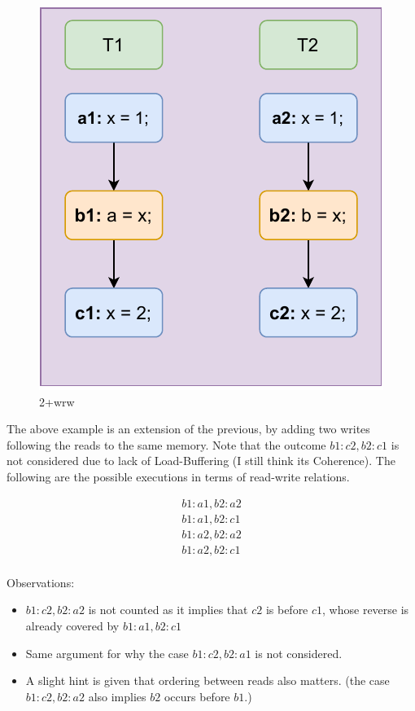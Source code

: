         \begin{figure}[H]
            \centering 
            \includegraphics[scale=0.7]{Example2(2+wrw).pdf}
            \caption{2+wrw}
        \end{figure}
        
        The above example is an extension of the previous, by adding two writes following the reads to the same memory. Note that the outcome $b1:c2, b2:c1$ is not considered due to lack of Load-Buffering (I still think its Coherence). The following are the possible executions in terms of read-write relations. 

        \begin{align*} 
            b1:a1 , b2:a2 \\
            b1:a1 , b2:c1 \\ 
            b1:a2 , b2:a2 \\
            b1:a2 , b2:c1 \\
        \end{align*}

        Observations:
        \begin{itemize}
            \item $b1:c2, b2:a2$ is not counted as it implies that $c2$ is before $c1$, whose reverse is already covered by $b1:a1 , b2:c1$
            \item Same argument for why the case $b1:c2, b2:a1$ is not considered.
            \item A slight hint is given that ordering between reads also matters. (the case $b1:c2, b2:a2$ also implies $b2$ occurs before $b1$.) 
        \end{itemize}


